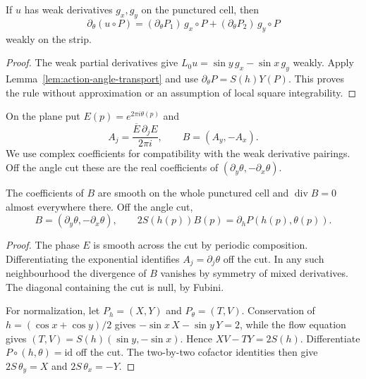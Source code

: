 \begin{lemma}
\label{lem:action-angle-weak-angular}
\leanok
If $u$ has weak derivatives $g_x,g_y$ on the punctured cell, then
\[
  \partial_\theta(u\circ P)
    =(\partial_\theta P_1)\,g_x\circ P
      +(\partial_\theta P_2)\,g_y\circ P
\]
weakly on the strip.
\end{lemma}

\begin{proof}
\leanok
The weak partial derivatives give
$L_0u=\sin y\,g_x-\sin x\,g_y$ weakly. Apply
Lemma~\ref{lem:action-angle-transport} and use
$\partial_\theta P=S(h)Y(P)$. This proves the rule without approximation
or an assumption of local square integrability.
\end{proof}

\begin{definition}
\label{def:level-dual-field}
\leanok
On the plane put $E(p)=e^{2\pi i\theta(p)}$ and
\[
  A_j=\frac{\overline E\,\partial_jE}{2\pi i},\qquad
  B=(A_y,-A_x).
\]
We use complex coefficients for compatibility with the weak derivative
pairings. Off the angle cut these are the real coefficients of
$(\partial_y\theta,-\partial_x\theta)$.
\end{definition}

\begin{lemma}
\label{lem:level-dual-field}
\leanok
The coefficients of $B$ are smooth on the whole punctured cell and
$\operatorname{div}B=0$ almost everywhere there. Off the angle cut,
\[
  B=(\partial_y\theta,-\partial_x\theta),\qquad
  2S(h(p))B(p)=\partial_hP(h(p),\theta(p)).
\]
\end{lemma}

\begin{proof}
\leanok
The phase $E$ is smooth across the cut by periodic composition.
Differentiating the exponential identifies $A_j=\partial_j\theta$
off the cut. In any such neighbourhood the divergence of $B$ vanishes
by symmetry of mixed derivatives. The diagonal containing the cut
is null, by Fubini.

For normalization, let $P_h=(X,Y)$ and $P_\theta=(T,V)$.
Conservation of $h=(\cos x+\cos y)/2$ gives
$-\sin x\,X-\sin y\,Y=2$, while the flow equation gives
$(T,V)=S(h)(\sin y,-\sin x)$. Hence $XV-TY=2S(h)$.
Differentiate $P\circ(h,\theta)=\mathrm{id}$ off the cut.
The two-by-two cofactor identities then give
$2S\,\theta_y=X$ and $2S\,\theta_x=-Y$.
\end{proof}

